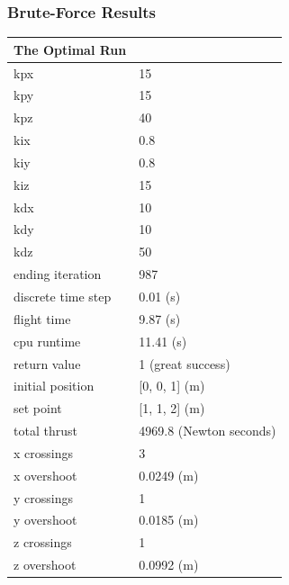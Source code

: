 \documentclass{beamer}
\begin{document}
\begin{frame}

\frametitle{Brute-Force Results}
{\scriptsize
\begin{table}\label{table:optimalrun}

\centering
\begin{tabular}{l l}
The Optimal Run      \\
\hline                        
kpx                 & 15 \\
kpy                 & 15 \\
kpz                 & 40 \\
kix                 & 0.8 \\
kiy                 & 0.8 \\
kiz                 & 15 \\
kdx                 & 10 \\
kdy                 & 10 \\
kdz                 & 50 \\
ending iteration    & 987 \\
discrete time step   & 0.01 (s)\\
flight time         & 9.87 (s) \\
cpu runtime         & 11.41 (s)\\
return value        & 1 (great success)\\
initial position    & [0, 0, 1] (m)\\
set point           & [1, 1, 2] (m) \\
total thrust        & 4969.8 (Newton seconds) \\
x crossings         & 3 \\
x overshoot         & 0.0249 (m) \\
y crossings         & 1 \\
y overshoot         & 0.0185 (m)\\
z crossings         & 1 \\
z overshoot         & 0.0992 (m) \\
\end{tabular}

\end{table}
}

\end{frame}
\end{document}
